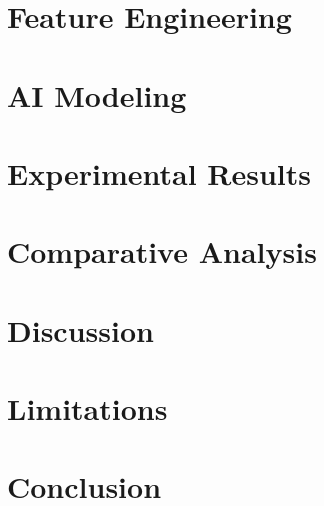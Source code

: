 \documentclass[onecolumn]{IEEEtran}
\begin{document}
\section{Feature Engineering}


\section{AI Modeling}


\section{Experimental Results}


\section{Comparative Analysis}


\section{Discussion}


\section{Limitations}


\section{Conclusion}



\end{document}
